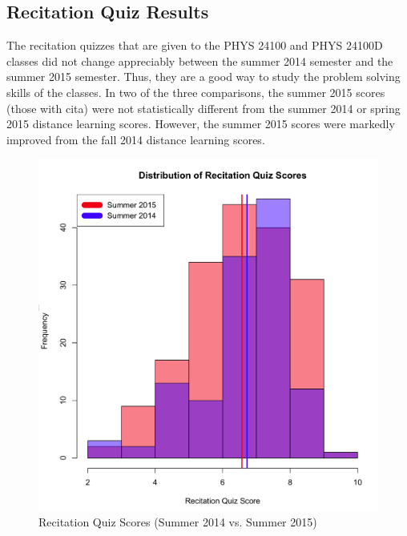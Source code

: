 \subsection{Recitation Quiz Results}

The recitation quizzes that are given to the PHYS 24100 and PHYS 24100D classes did not change appreciably between the summer 2014 semester and the summer 2015 semester. Thus, they are a good way to study the problem solving skills of the classes. In two of the three comparisons, the summer 2015 scores (those with \gls{cita}) were not statistically different from the summer 2014 or spring 2015 distance learning scores. However, the summer 2015 scores were markedly improved from the fall 2014 distance learning scores.

\begin{figure}
	\centering
	\includegraphics[width=5in]{img/chapter4/rq_su15_vs_su14}
	\caption[Recitation Quiz Scores (Summer 2014 vs. Summer 2015)]{Recitation Quiz Scores (Summer 2014 vs. Summer 2015)}
  \label{fig:rqSu14Su15}
\end{figure}

